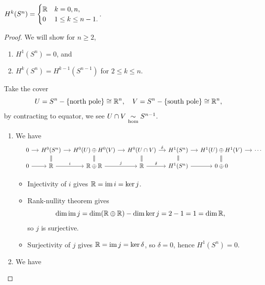 \begin{example}
    \(H^k(S^n) = \begin{cases}
        \mathbb{R} & k = 0, n,\\
        0 & 1\leq k\leq n-1.
    \end{cases}\).
\end{example}
\begin{proof}
    We will show for \(n\geq 2\), \begin{enumerate}[label=({\itshape \arabic*})]
        \item \(H^1(S^n) = 0\), and
        \item \(H^k(S^n) = H^{k-1}(S^{n-1})\) for \(2\leq k\leq n\).
    \end{enumerate}
    Take the cover \[
        U = S^n\mathbin{-}\{\text{north pole}\} \cong \mathbb{R}^n,\quad
        V = S^n\mathbin{-}\{\text{south pole}\} \cong \mathbb{R}^n,
    \] by contracting to equator, we see \(U\cap V\underset{\mathrm{hom}}{\sim} S^{n-1}\).
    \begin{enumerate}[label=({\itshape \arabic*})]
        \item We have \[
            \begin{tikzcd}[sep=small]
                & 0 \ar{r}
                & H^0(S^n) \ar{r} \ar[equals]{d}
                & H^0(U)\oplus H^0(V) \ar{r} \ar[equals]{d}
                & H^0(U\cap V) \ar{r}{\delta} \ar[equals]{d}
                & H^1(S^n) \ar{r} \ar[equals]{d}
                & H^1(U)\oplus H^1(V) \ar{r} \ar[equals]{d}
                & \cdots \\
                & 0 \ar{r}
                & \R \ar{r}{i}
                & \R\oplus\R \ar{r}{j}
                & \R \ar{r}{\delta}
                & H^1(S^n) \ar{r}
                & 0 \oplus 0
            \end{tikzcd}
        \]
        \begin{itemize}
            \item Injectivity of \(i\) gives \(\mathbb{R} = \operatorname{im} i = \ker j\).
            \item Rank-nullity theorem gives \[
                \dim\operatorname{im} j = \dim(\mathbb{R}\oplus\mathbb{R}) - \dim\ker j = 2 - 1 = 1 = \dim\mathbb{R},
            \] so \(j\) is surjective.
            \item Surjectivity of \(j\) gives \(\mathbb{R} = \operatorname{im} j = \ker\delta\), so \(\delta = 0\), hence \(H^1(S^n) = 0\).
        \end{itemize}
        \item We have \[
\]
\end{enumerate}
\end{proof}
